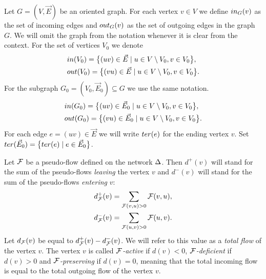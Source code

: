 \documentclass[12pt,oneside,a4paper]{amsart}
\begin{document}
      \begin{definition}
        Let $G = (V, \vec{E})$ be an oriented graph.
        For each vertex $v \in V$ we define $in_G(v)$ as the set of incoming edges
          and $out_G(v)$ as the set of outgoing edges in the graph $G$.
        We will omit the graph from the notation whenever it is clear from the context.
        For the set of vertices $V_0$ we denote
        \begin{align*}
          &in(V_0) = \big\{(uv)\in \vec{E} \mid u \in V \setminus V_0, v \in V_0\big\},\\
          &out(V_0) = \big\{(vu) \in \vec{E} \mid u \in V\setminus V_0, v \in V_0\big\}.
        \end{align*}
        For the subgraph $G_0 = (V_0, \vec{E}_0) \subseteq G$ we use the same notation.
        \begin{align*}
          &in(G_0) = \big\{(uv)\in \vec{E}_0 \mid u \in V \setminus V_0, v \in V_0\big\},\\
          &out(G_0) = \big\{(vu) \in \vec{E}_0 \mid u \in V\setminus V_0, v \in V_0\big\}.
        \end{align*}
        For each edge $e=(uv) \in \vec{E}$ we will write %
          $ter(e)$ for the ending vertex $v$.
        Set $ter(\vec{E}_0) = \big\{ter(e) \mid e\in \vec{E}_0\big\}$.
      \end{definition}
      \begin{definition}
        Let $\mathcal{F}$ be a pseudo-flow defined on the network $\Delta$.
        Then $d^{+}(v)$ will stand for the sum of the pseudo-flows \emph{leaving} the vertex $v$ and
        $d^{-}(v)$ will stand for the sum of the pseudo-flows \emph{entering} $v$:
        \begin{align*}
          &d^{+}_{\mathcal{F}}(v) = \sum_{\mathcal{F}(v, u) > 0} \mathcal{F}(v,u),\\
          &d^{-}_{\mathcal{F}}(v) = \sum_{\mathcal{F}(u, v) > 0} \mathcal{F}(u,v).
        \end{align*}
        Let $d_{\mathcal{F}}(v)$ be equal to $d^{+}_{\mathcal{F}}(v) - d^{-}_{\mathcal{F}}(v)$.
        We will refer to this value as a \emph{total flow} of the vertex $v$.
        The vertex $v$ is called \emph{$\mathcal{F}$-active} if $d(v) < 0$,
          \emph{$\mathcal{F}$-deficient} if $d(v) > 0$ and
          \emph{$\mathcal{F}$-preserving} if $d(v) = 0$, meaning that the total incoming flow
          is equal to the total outgoing flow of the vertex $v$.
      \end{definition}
\end{document}
